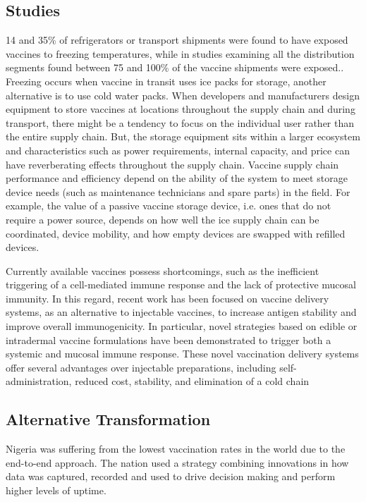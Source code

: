 \documentclass{article}
\begin{document}
\subsection{Studies}

14 and 35\% of refrigerators or transport shipments were found to have exposed vaccines to freezing temperatures, while in studies examining all the distribution segments found between 75 and 100\% of the vaccine shipments were exposed.\cite{kartoglu2014tools}. Freezing occurs when vaccine in transit uses ice packs for storage, another alternative is to use cold water packs. When developers and manufacturers design equipment to store vaccines at locations throughout the supply chain and during transport, there might be a tendency to focus on the individual user rather than the entire supply chain. But, the storage equipment sits within a larger ecosystem and characteristics such as power requirements, internal capacity, and price can have reverberating effects throughout the supply chain. Vaccine supply chain performance and efficiency depend on the ability of the system to meet storage device needs (such as maintenance technicians and spare parts) in the field. For example, the value of a passive vaccine storage device, i.e. ones that do not require a power source, depends on how well the ice supply chain can be coordinated, device mobility, and how empty devices are swapped with refilled devices.\cite{lee2017importance}
 
Currently available vaccines possess shortcomings, such as the inefficient triggering of a cell-mediated immune response and the lack of protective mucosal immunity. In this regard, recent work has been focused on vaccine delivery systems, as an alternative to injectable vaccines, to increase antigen stability and improve overall immunogenicity. In particular, novel strategies based on edible or intradermal vaccine formulations have been demonstrated to trigger both a systemic and mucosal immune response. These novel vaccination delivery systems offer several advantages over injectable preparations, including self-administration, reduced cost, stability, and elimination of a cold chain \cite{criscuolo2019alternative}
 
 \subsection{Alternative Transformation}
 Nigeria was suffering from the lowest vaccination rates in the world due to the end-to-end approach. The nation used a strategy combining innovations in how data was captured, recorded and used to drive decision making and perform higher levels of uptime.\cite{sarley2017transforming}
 
\end{document}
